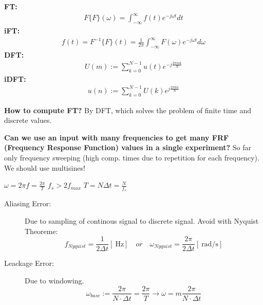 \begin{tcolorbox}[colback=brown!5!white,colframe=brown!75!black,title=\textbf{Fourier Transformation}]
	\textbf{FT:}\begin{align*}
	F\{F\}(\omega) = \int_{-\infty}^{\infty} f(t) e^{-j\omega t}dt
	\end{align*}
	\textbf{iFT:}\begin{align*}
	f(t) = F^{-1}\{F\}(t) = \frac{1}{2\pi}\int_{-\infty}^{\infty} F(\omega) e^{-j\omega t}d\omega
	\end{align*}
	\textbf{DFT:}\begin{align*}
	U(m) := \sum_{k = 0}^{N-1} u(t)e^{-j\frac{2\pi m k}{N}}
	\end{align*}
	\textbf{iDFT:}\begin{align*}
	u(n) := \sum_{k = 0}^{N-1} U(k)e^{j\frac{2\pi k n}{N}}
	\end{align*}
	
\textbf{How to compute FT?} By DFT, which solves the problem of finite time and discrete values.

\textbf{Can we use an input with many frequencies to get many FRF (Frequency Response Function) values in a single experiment?} So far only frequency sweeping (high comp. times due to repetition for each frequency). We should use multisines!
\end{tcolorbox}

\begin{tcolorbox}[colback=brown!5!white,colframe=brown!75!black,title=\textbf{Useful frequency things}]
$\omega = 2\pi f = \frac{2\pi}{T}$ \quad $f_s > 2 f_{max}$ \quad $T = N \Delta{t} = \frac{N}{f_s} $\quad 
\end{tcolorbox}

\begin{tcolorbox}[colback=brown!5!white,colframe=brown!75!black,title=\textbf{Aliasing and Leakage Errors}]
\begin{description}
	\item[Aliasing Error:] Due to sampling of continous signal to discrete signal. Avoid with Nyquist Theoreme:
	\begin{equation*}
	f_{Nyquist} = \frac{1}{2\Delta t} [\SI{}{\hertz}] \quad or \quad \omega_{Nyquist} = \frac{2\pi}{2\Delta t} [\SI{}{\radian \per \second}]
	\end{equation*}
	
	\item[Leackage Error:] Due to windowing.
	\begin{equation*}
	\omega_{base} := \frac{2\pi}{N \cdot \Delta t} = \frac{2\pi}{T} \rightarrow \omega = m \frac{2\pi }{N \cdot \Delta t}
	\end{equation*}
\end{description}
\end{tcolorbox}

